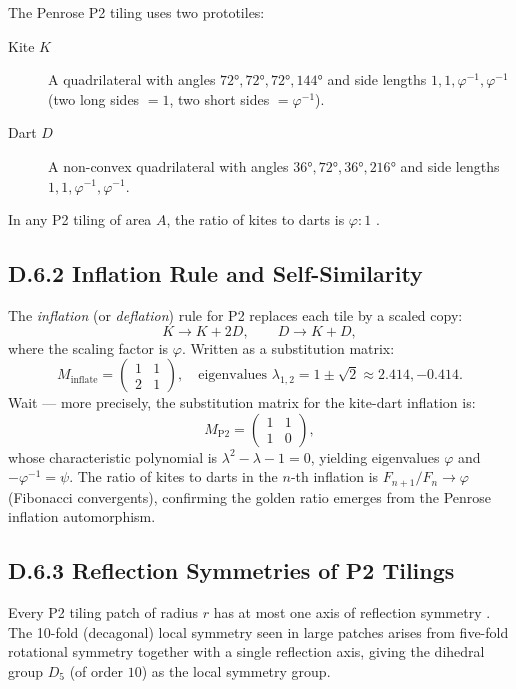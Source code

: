 The Penrose P2 tiling \cite{penrose1974} uses two prototiles:
\begin{description}
  \item[Kite $K$] A quadrilateral with angles $72°, 72°, 72°, 144°$ and side
    lengths $1, 1, \varphi^{-1}, \varphi^{-1}$ (two long sides $=1$, two short sides $=\varphi^{-1}$).
  \item[Dart $D$] A non-convex quadrilateral with angles $36°, 72°, 36°, 216°$
    and side lengths $1, 1, \varphi^{-1}, \varphi^{-1}$.
\end{description}
In any P2 tiling of area $A$, the ratio of kites to darts is $\varphi : 1$
\cite{penrose1974,coxeter_regular_polytopes}.

\subsection*{D.6.2  Inflation Rule and Self-Similarity}

The \emph{inflation} (or \emph{deflation}) rule for P2 replaces each tile by a
scaled copy:
\[
  K \to K + 2D, \qquad D \to K + D,
\]
where the scaling factor is $\varphi$.  Written as a substitution matrix:
\[
  M_{\mathrm{inflate}} =
  \begin{pmatrix} 1 & 1 \\ 2 & 1 \end{pmatrix},
  \quad\text{eigenvalues } \lambda_{1,2} = 1 \pm \sqrt{2} \approx 2.414, -0.414.
\]
Wait — more precisely, the substitution matrix for the kite-dart inflation is:
\[
  M_{\mathrm{P2}} = \begin{pmatrix} 1 & 1 \\ 1 & 0 \end{pmatrix},
\]
whose characteristic polynomial is $\lambda^2 - \lambda - 1 = 0$, yielding
eigenvalues $\varphi$ and $-\varphi^{-1} = \psi$.  The ratio of kites to darts
in the $n$-th inflation is $F_{n+1}/F_n \to \varphi$ (Fibonacci convergents),
confirming the golden ratio emerges from the Penrose inflation automorphism.

\subsection*{D.6.3  Reflection Symmetries of P2 Tilings}

Every P2 tiling patch of radius $r$ has at most one axis of reflection symmetry
\cite{penrose1974}.  The 10-fold (decagonal) local symmetry seen in large patches
arises from five-fold rotational symmetry together with a single reflection axis,
giving the dihedral group $D_5$ (of order $10$) as the local symmetry group.

